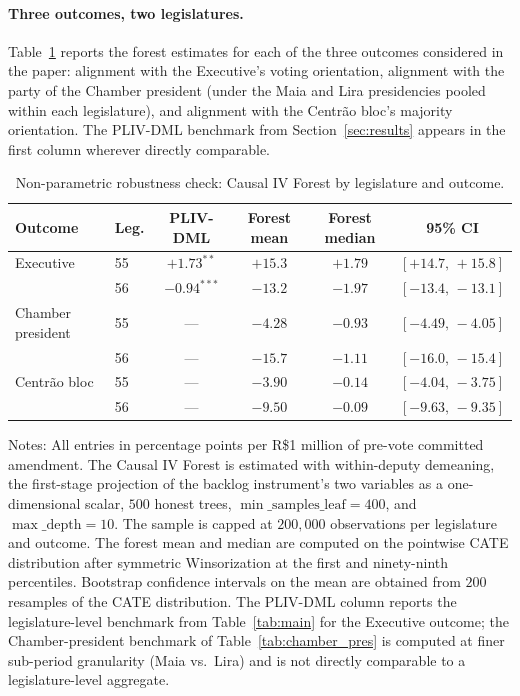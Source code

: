 \documentclass[preprint,12pt,authoryear]{elsarticle}
\begin{document}
\paragraph{Three outcomes, two legislatures.} Table~\ref{tab:cforest} reports the forest estimates for each of the three outcomes considered in the paper: alignment with the Executive's voting orientation, alignment with the party of the Chamber president (under the Maia and Lira presidencies pooled within each legislature), and alignment with the Centr\~ao bloc's majority orientation. The PLIV-DML benchmark from Section~\ref{sec:results} appears in the first column wherever directly comparable.

\begin{table}[htbp]
\centering
\caption{Non-parametric robustness check: Causal IV Forest by legislature and outcome.}
\label{tab:cforest}
\begin{threeparttable}
\footnotesize
\setlength{\tabcolsep}{4pt}
\begin{tabular}{llcccc}
\toprule
Outcome & Leg. & PLIV-DML & Forest mean & Forest median & 95\% CI \\
\midrule
Executive         & 55 & $+1.73^{**}$  & $+15.3$ & $+1.79$ & $[+14.7,\,+15.8]$ \\
                   & 56 & $-0.94^{***}$ & $-13.2$ & $-1.97$ & $[-13.4,\,-13.1]$ \\
\addlinespace
Chamber president & 55 & ---           & $-4.28$ & $-0.93$ & $[-4.49,\,-4.05]$ \\
                   & 56 & ---           & $-15.7$ & $-1.11$ & $[-16.0,\,-15.4]$ \\
\addlinespace
Centr\~ao bloc     & 55 & ---           & $-3.90$ & $-0.14$ & $[-4.04,\,-3.75]$ \\
                   & 56 & ---           & $-9.50$ & $-0.09$ & $[-9.63,\,-9.35]$ \\
\bottomrule
\end{tabular}
\begin{tablenotes}
\small
\item Notes: All entries in percentage points per R\$1 million of pre-vote committed amendment. The Causal IV Forest is estimated with within-deputy demeaning, the first-stage projection of the backlog instrument's two variables as a one-dimensional scalar, $500$ honest trees, $\min\_\mathrm{samples\_leaf} = 400$, and $\max\_\mathrm{depth} = 10$. The sample is capped at $200{,}000$ observations per legislature and outcome. The forest mean and median are computed on the pointwise CATE distribution after symmetric Winsorization at the first and ninety-ninth percentiles. Bootstrap confidence intervals on the mean are obtained from $200$ resamples of the CATE distribution. The PLIV-DML column reports the legislature-level benchmark from Table~\ref{tab:main} for the Executive outcome; the Chamber-president benchmark of Table~\ref{tab:chamber_pres} is computed at finer sub-period granularity (Maia vs.\ Lira) and is not directly comparable to a legislature-level aggregate.
\end{tablenotes}
\end{threeparttable}
\end{table}
\end{document}
